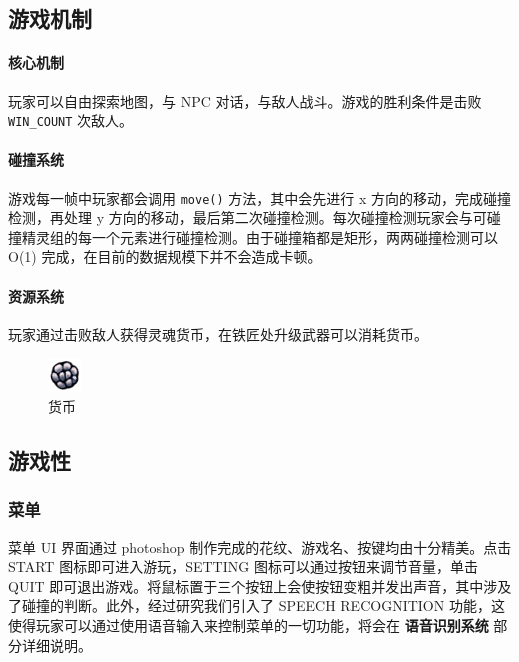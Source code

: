 \documentclass[12pt, twoside, a4paper]{article}
\newcommand{\inlinecode}[1]{\setlength{\fboxsep}{0.8mm} \colorbox{lightgray!40}{\texttt{#1}}}
\begin{document}
\subsection{游戏机制}

\paragraph{核心机制} 玩家可以自由探索地图，与 NPC 对话，与敌人战斗。游戏的胜利条件是击败 \inlinecode{WIN\_COUNT} 次敌人。

\paragraph{碰撞系统} 游戏每一帧中玩家都会调用 \inlinecode{move()} 方法，其中会先进行 x 方向的移动，完成碰撞检测，再处理 y 方向的移动，最后第二次碰撞检测。每次碰撞检测玩家会与可碰撞精灵组的每一个元素进行碰撞检测。由于碰撞箱都是矩形，两两碰撞检测可以 O(1) 完成，在目前的数据规模下并不会造成卡顿。

\paragraph{资源系统} 玩家通过击败敌人获得灵魂货币，在铁匠处升级武器可以消耗货币。

\begin{figure}[h!]
    \centering
    \includegraphics[width=0.08\textwidth]{assets/report/coin.png}
    \caption{货币}
\end{figure}

\subsection{游戏性}

\subsubsection{菜单}

菜单 UI 界面通过 photoshop 制作完成的花纹、游戏名、按键均由十分精美。点击 START 图标即可进入游玩，SETTING 图标可以通过按钮来调节音量，单击 QUIT 即可退出游戏。将鼠标置于三个按钮上会使按钮变粗并发出声音，其中涉及了碰撞的判断。此外，经过研究我们引入了 SPEECH RECOGNITION 功能，这使得玩家可以通过使用语音输入来控制菜单的一切功能，将会在 \textbf{语音识别系统} 部分详细说明。
\end{document}
